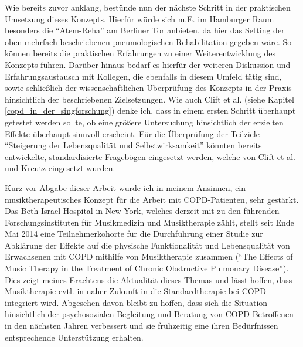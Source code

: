 
Wie bereits zuvor anklang, bestünde nun der nächste Schritt in der praktischen Umsetzung dieses Konzepts. Hierfür würde sich m.E. im Hamburger Raum besonders die "`Atem-Reha"' am Berliner Tor anbieten, da hier das Setting der oben mehrfach beschriebenen pneumologischen Rehabilitation gegeben wäre. So können bereits die praktischen Erfahrungen zu einer Weiterentwicklung des Konzepts führen. Darüber hinaus bedarf es hierfür der weiteren Diskussion und Erfahrungsaustausch mit Kollegen, die ebenfalls in diesem Umfeld tätig sind, sowie schließlich der wissenschaftlichen Überprüfung des Konzepts in der Praxis hinsichtlich der beschriebenen Zielsetzungen. Wie auch Clift et al. (siehe Kapitel \ref{copd_in_der_singforschung}) denke ich, dass in einem ersten Schritt überhaupt getestet werden sollte, ob eine größere Untersuchung hinsichtlich der erzielten Effekte überhaupt sinnvoll erscheint. Für die Überprüfung der Teilziele "`Steigerung der Lebensqualität und Selbstwirksamkeit"' könnten bereits entwickelte, standardisierte Fragebögen eingesetzt werden, welche von Clift et al. und Kreutz eingesetzt wurden.

Kurz vor Abgabe dieser Arbeit wurde ich in meinem Ansinnen, ein musiktherapeutisches Konzept für die Arbeit mit COPD-Patienten, sehr gestärkt. Das Beth-Israel-Hospital in New York, welches derzeit mit zu den führenden Forschungsinstituten für Musikmedizin und Musiktherapie zählt, stellt seit Ende Mai 2014 eine Teilnehmerkohorte für die Durchführung einer Studie zur Abklärung der Effekte auf die physische Funktionalität und Lebensqualität von Erwachsenen mit COPD mithilfe von Musiktherapie zusammen ("`The Effects of Music Therapy in the Treatment of Chronic Obstructive Pulmonary Disease"'). Dies zeigt meines Erachtens die Aktualität dieses Themas und lässt hoffen, dass Musiktherapie evtl. in naher Zukunft in die Standardtherapie bei COPD integriert wird. Abgesehen davon bleibt zu hoffen, dass sich die Situation hinsichtlich der psychosozialen Begleitung und Beratung von COPD-Betroffenen in den nächsten Jahren verbessert und sie frühzeitig eine ihren Bedürfnissen entsprechende Unterstützung erhalten.


\newpage\thispagestyle{empty}
